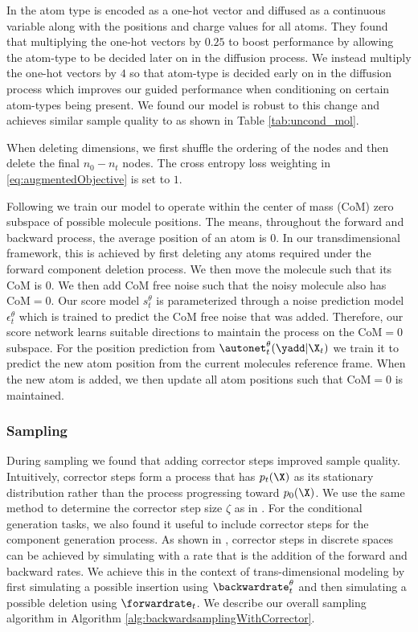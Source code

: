 In \cite{hoogeboom2022equivariant} the atom type is encoded as a one-hot vector and diffused as a continuous variable along with the positions and charge values for all atoms. They found that multiplying the one-hot vectors by $0.25$ to boost performance by allowing the atom-type to be decided later on in the diffusion process. We instead multiply the one-hot vectors by $4$ so that atom-type is decided early on in the diffusion process which improves our guided performance when conditioning on certain atom-types being present. We found our model is robust to this change and achieves similar sample quality to \cite{hoogeboom2022equivariant} as shown in Table \ref{tab:uncond_mol}.

When deleting dimensions, we first shuffle the ordering of the nodes and then delete the final $n_0 - n_t$ nodes. The cross entropy loss weighting in \eqref{eq:augmentedObjective} is set to $1$.

Following \cite{hoogeboom2022equivariant} we train our model to operate within the center of mass (CoM) zero subspace of possible molecule positions. The means, throughout the forward and backward process, the average position of an atom is $0$. In our transdimensional framework, this is achieved by first deleting any atoms required under the forward component deletion process. We then move the molecule such that its CoM is $0$. We then add CoM free noise such that the noisy molecule also has CoM$=0$. Our score model $s_t^\theta$ is parameterized through a noise prediction model $\epsilon_t^\theta$ which is trained to predict the CoM free noise that was added. Therefore, our score network learns suitable directions to maintain the process on the CoM$=0$ subspace. For the position prediction from $\autonet_t^\theta(\yadd | \X_t)$ we train it to predict the new atom position from the current molecules reference frame. When the new atom is added, we then update all atom positions such that CoM$=0$ is maintained.

\subsubsection{Sampling}
During sampling we found that adding corrector steps \cite{song2020score} improved sample quality. Intuitively, corrector steps form a process that has $p_t(\X)$ as its stationary distribution rather than the process progressing toward $p_0(\X)$. We use the same method to determine the corrector step size $\zeta$ as in \cite{song2020score}. For the conditional generation tasks, we also found it useful to include corrector steps for the component generation process. As shown in \cite{campbell2022continuous}, corrector steps in discrete spaces can be achieved by simulating with a rate that is the addition of the forward and backward rates. We achieve this in the context of trans-dimensional modeling by first simulating a possible insertion using $\backwardrate_t^\theta$ and then simulating a possible deletion using $\forwardrate_t$. We describe our overall sampling algorithm in Algorithm \ref{alg:backwardsamplingWithCorrector}.

